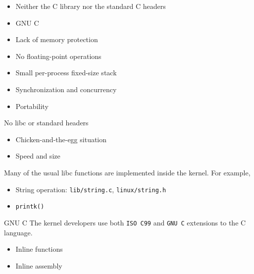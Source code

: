 \begin{frame}
  \begin{itemize}
  \item Neither the C library nor the standard C headers
  \item GNU C
  \item Lack of memory protection
  \item No floating-point operations
  \item Small per-process fixed-size stack
  \item Synchronization and concurrency
  \item Portability
  \end{itemize}
\end{frame}

\begin{frame}
  \begin{block}{No libc or standard headers}
    \begin{itemize}
    \item Chicken-and-the-egg situation
    \item Speed and size
    \end{itemize}
    Many of the usual libc functions are implemented inside the kernel. For example,
    \begin{itemize}
    \item String operation: \texttt{lib/string.c}, \texttt{linux/string.h}
    \item \texttt{printk()}
    \end{itemize}
  \end{block}
\end{frame}

\begin{frame}{GNU C}
  The kernel developers use both \texttt{ISO C99} and \texttt{GNU C} extensions to the C
  language.
  \begin{itemize}
  \item Inline functions
  \item Inline assembly
  \end{itemize}
\end{frame}


